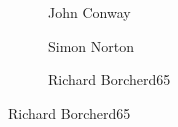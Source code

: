 \begin{frame}[plain]
\begin{figure}[h]
\begin{subfigure}{0.20\textwidth}
	\caption{\tiny \hspace{0.2cm}John Conway}
	\end{subfigure}
	\begin{subfigure}{0.20\textwidth}
	\captionsetup{labelformat=empty}
	\centering
	\caption{\tiny \hspace{0.2cm}Simon Norton}
	\end{subfigure} \quad
	\begin{subfigure}{0.20\textwidth}
	\captionsetup{labelformat=empty}
	\centering
	\caption{\tiny Richard Borcherd65}
	\end{subfigure}
	\end{figure}


\end{frame}
